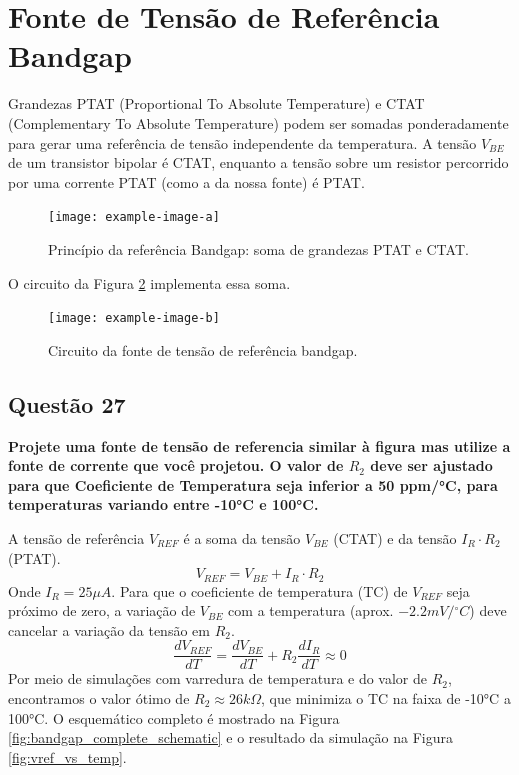 ﻿\documentclass[12pt,a4paper]{article}
\newcommand{\degree}{\ensuremath{{}^\circ}}
\begin{document}
\section*{Fonte de Tensão de Referência Bandgap}

Grandezas PTAT (Proportional To Absolute Temperature) e CTAT (Complementary To Absolute Temperature) podem ser somadas ponderadamente para gerar uma referência de tensão independente da temperatura. A tensão $V_{BE}$ de um transistor bipolar é CTAT, enquanto a tensão sobre um resistor percorrido por uma corrente PTAT (como a da nossa fonte) é PTAT.

\begin{figure}[H]
\centering
\texttt{[image: example-image-a]}
\caption{Princípio da referência Bandgap: soma de grandezas PTAT e CTAT.}
\label{fig:bandgap_principle}
\end{figure}

O circuito da Figura \ref{fig:bandgap_circuit} implementa essa soma.

\begin{figure}[H]
\centering
\texttt{[image: example-image-b]}
\caption{Circuito da fonte de tensão de referência bandgap.}
\label{fig:bandgap_circuit}
\end{figure}

\subsection*{Questão 27}
\textbf{Projete uma fonte de tensão de referencia similar à figura mas utilize a fonte de corrente que você projetou. O valor de $R_2$ deve ser ajustado para que Coeficiente de Temperatura seja inferior a 50 ppm/°C, para temperaturas variando entre -10°C e 100°C.}

A tensão de referência $V_{REF}$ é a soma da tensão $V_{BE}$ (CTAT) e da tensão $I_R \cdot R_2$ (PTAT).
$$V_{REF} = V_{BE} + I_R \cdot R_2$$
Onde $I_R = 25\mu A$. Para que o coeficiente de temperatura (TC) de $V_{REF}$ seja próximo de zero, a variação de $V_{BE}$ com a temperatura (aprox. $-2.2mV/\degree C$) deve cancelar a variação da tensão em $R_2$.
$$\frac{dV_{REF}}{dT} = \frac{dV_{BE}}{dT} + R_2 \frac{dI_R}{dT} \approx 0$$
Por meio de simulações com varredura de temperatura e do valor de $R_2$, encontramos o valor ótimo de $R_2 \approx 26k\Omega$, que minimiza o TC na faixa de -10°C a 100°C. O esquemático completo é mostrado na Figura \ref{fig:bandgap_complete_schematic} e o resultado da simulação na Figura \ref{fig:vref_vs_temp}.
\end{document}
